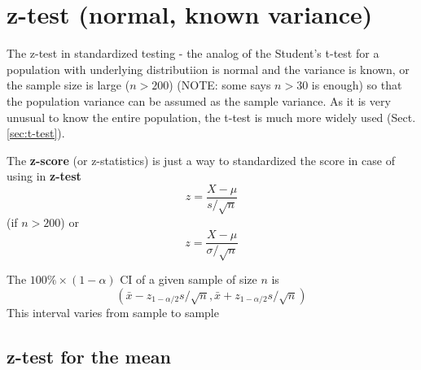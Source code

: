 \section{z-test (normal, known variance)}
\label{sec:z-test}

The z-test in standardized testing - the analog of the Student's t-test for a
population with underlying distributiion is normal and the variance is known, or
the sample size is large ($n>200$) (NOTE: some says $n>30$ is enough) so that
the population variance can be assumed as the sample variance. As it is very
unusual to know the entire population, the t-test is much more widely used
(Sect.\ref{sec:t-test}). 

The {\bf z-score} (or z-statistics) is just a way to standardized the
score in case of using in {\bf z-test}
\begin{equation}
  \label{eq:43}
  z = \frac{X-\mu}{s/\sqrt{n}}
\end{equation}
(if $n>200$) or
\begin{equation}
  \label{eq:44}
  z = \frac{X-\mu}{\sigma/\sqrt{n}}
\end{equation}

The $100\%\times (1-\alpha)$ CI of a given sample of size $n$ is
\begin{equation}
  \label{eq:45}
  (\bar{x}-z_{1-\alpha/2} s/\sqrt{n},  \bar{x}+z_{1-\alpha/2} s/\sqrt{n})
\end{equation}
This interval varies from sample to sample


\subsection{z-test for the mean}
\label{sec:z-test-mean}


